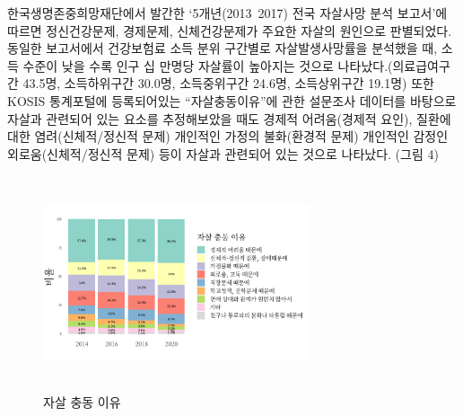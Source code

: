 \documentclass[a4paper, 11pt]{oblivoir}
\begin{document}
    한국생명존중희망재단에서 발간한 `5개년(2013~2017) 전국 자살사망 분석 보고서'에 따르면 정신건강문제, 경제문제, 신체건강문제가 주요한 자살의 원인으로 판별되었다.
    동일한 보고서에서 건강보험료 소득 분위 구간별로 자살발생사망률을 분석했을 때, 소득 수준이 낮을 수록 인구 십 만명당 자살률이 높아지는 것으로 나타났다.(의료급여구간 43.5명,
    소득하위구간 30.0명, 소득중위구간 24.6명, 소득상위구간 19.1명)
    또한 KOSIS 통계포털에 등록되어있는 ``자살충동이유''에 관한 설문조사 데이터를 바탕으로 자살과 관련되어 있는 요소를 추정해보았을 때도 
    경제적 어려움(경제적 요인), 질환에 대한 염려(신체적/정신적 문제) 개인적인 가정의 불화(환경적 문제) 개인적인 감정인 외로움(신체적/정신적 문제) 등이
    자살과 관련되어 있는 것으로 나타났다. (그림 4)
    \begin{figure}[!ht]
        \includegraphics[height = 6.3cm, width = 0.7\textwidth]{picture4.png}
        \caption{자살 충동 이유}
        \label{fig:pic4}
      \end{figure}
    
\end{document}
